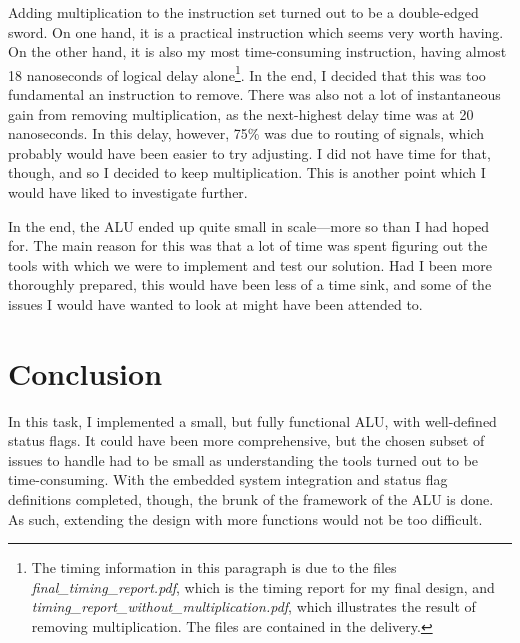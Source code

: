\documentclass{article}
\begin{document}
Adding multiplication to the instruction set turned out to be a double-edged sword. On one hand, it is a practical instruction which seems very worth having. On the other hand, it is also my most time-consuming instruction, having almost 18 nanoseconds of logical delay alone\footnote{The timing information in this paragraph is due to the files \emph{final\_timing\_report.pdf}, which is the timing report for my final design, and \emph{timing\_report\_without\_multiplication.pdf}, which illustrates the result of removing multiplication. The files are contained in the delivery.}. In the end, I decided that this was too fundamental an instruction to remove. There was also not a lot of instantaneous gain from removing multiplication, as the next-highest delay time was at 20 nanoseconds. In this delay, however, 75\% was due to routing of signals, which probably would have been easier to try adjusting. I did not have time for that, though, and so I decided to keep multiplication. This is another point which I would have liked to investigate further. 

In the end, the ALU ended up quite small in scale---more so than I had hoped for. The main reason for this was that a lot of time was spent figuring out the tools with which we were to implement and test our solution. Had I been more thoroughly prepared, this would have been less of a time sink, and some of the issues I would have wanted to look at might have been attended to.
\section{Conclusion}
\label{sec:conclusion}
In this task, I implemented a small, but fully functional ALU, with well-defined status flags. It could have been more comprehensive, but the chosen subset of issues to handle had to be small as understanding the tools turned out to be time-consuming. With the embedded system integration and status flag definitions completed, though, the brunk of the framework of the ALU is done. As such, extending the design with more functions would not be too difficult.
\end{document}

